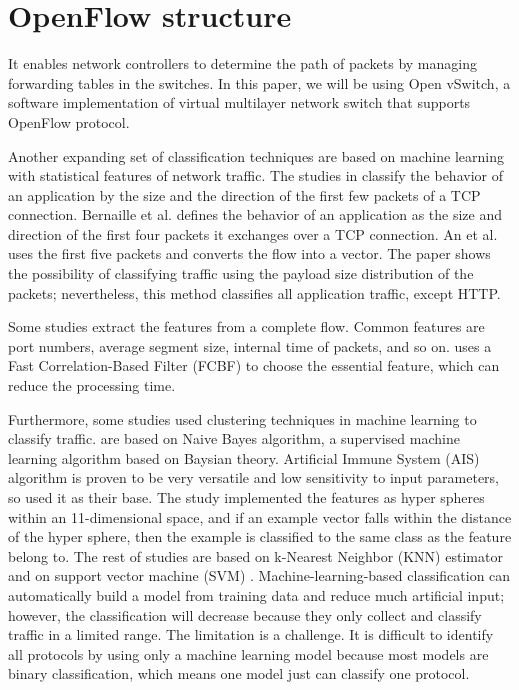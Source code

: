 \section{OpenFlow structure}
\label{sec:flow}
It enables network controllers to determine the path of packets by managing forwarding tables in the switches\cite{OF_WIKI}. In this paper, we will be using Open vSwitch, a software implementation of virtual multilayer network switch that supports OpenFlow protocol. 

Another expanding set of classification techniques are based on machine learning with statistical features of network traffic. The studies in \cite{EAI06, ATC13} classify the behavior of an application by the size and the direction of the first few packets of a TCP connection. Bernaille et al. \cite{EAI06} defines the behavior of an application as the size and direction of the first four packets it exchanges over a TCP connection. An et al. \cite{ATC13} uses the first five packets and converts the flow into a vector. The paper shows the possibility of classifying traffic using the payload size distribution of the packets; nevertheless, this method classifies all application traffic, except HTTP.

Some studies \cite{AIS14, CMF04, COC12} extract the features from a complete flow. Common features are port numbers, average segment size, internal time of packets, and so on. \cite{AIS14} uses a Fast Correlation-Based Filter (FCBF) to choose the essential feature, which can reduce the processing time. 

Furthermore, some studies \cite{FPN13, RTC10, AIS14, ASA09, FTC09} used clustering techniques in machine learning to classify traffic. \cite{FPN13, RTC10} are based on Naive Bayes algorithm, a supervised machine learning algorithm based on Baysian theory. Artificial Immune System (AIS) algorithm is proven to be very versatile and low sensitivity to input parameters, so \cite{AIS14} used it as their base. The study implemented the features as hyper spheres within an 11-dimensional space, and if an example vector falls within the distance of the hyper sphere, then the example is classified to the same class as the feature belong to. The rest of studies are based on k-Nearest Neighbor (KNN) estimator \cite{ASA09} and on support vector machine (SVM) \cite{FTC09}. Machine-learning-based classification can automatically build a model from training data and reduce much artificial input; however, the classification will decrease because they only collect and classify traffic in a limited range. The limitation is a challenge. It is difficult to identify all protocols by using only a machine learning model because most models are binary classification, which means one model just can classify one protocol.


